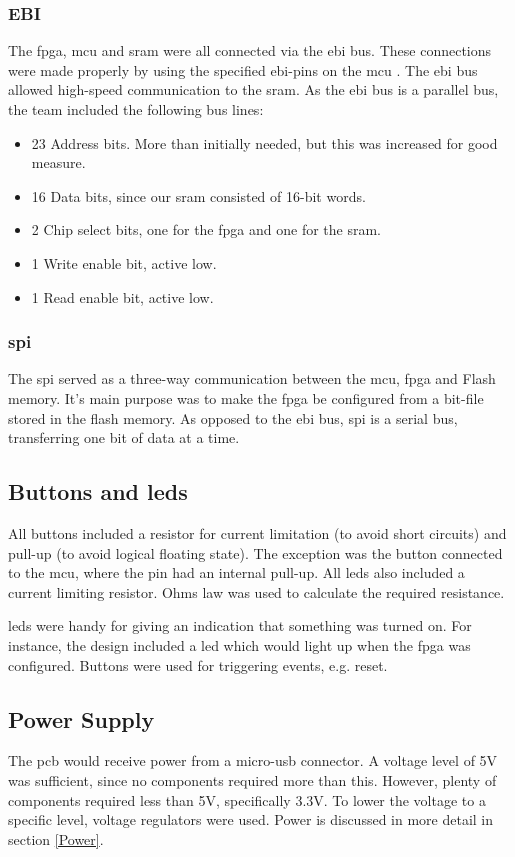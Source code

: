 \subsubsection{EBI}
The \gls{fpga}, \gls{mcu} and \gls{sram} were all connected via the \gls{ebi} bus.
These connections were made properly by using the specified \gls{ebi}-pins on the \gls{mcu} \cite[sec. 4.1]{efm32-datasheet}.
The \gls{ebi} bus allowed high-speed communication to the \gls{sram}.
As the \gls{ebi} bus is a parallel bus, the team included the following bus lines:
\begin{itemize}
\item 23 Address bits. More than initially needed, but this was increased for good measure.
\item 16 Data bits, since our \gls{sram} consisted of 16-bit words.
\item 2 Chip select bits, one for the \gls{fpga} and one for the \gls{sram}.
\item 1 Write enable bit, active low.
\item 1 Read enable bit, active low.
\end{itemize}

\subsubsection{\gls{spi}}
The \gls{spi} served as a three-way communication between the \gls{mcu}, \gls{fpga} and Flash memory.
It's main purpose was to make the \gls{fpga} be configured from a bit-file stored in the flash memory.
As opposed to the \gls{ebi} bus, \gls{spi} is a serial bus, transferring one bit of data at a time.

\subsection{Buttons and \gls{led}s}
All buttons included a resistor for current limitation (to avoid short circuits) and pull-up (to avoid logical floating state).
The exception was the button connected to the \gls{mcu}, where the pin had an internal pull-up.
All \gls{led}s also included a current limiting resistor.
Ohms law was used to calculate the required resistance\cite{ohm}.

\gls{led}s were handy for giving an indication that something was turned on.
For instance, the design included a \gls{led} which would light up when the \gls{fpga} was configured.
Buttons were used for triggering events, e.g. reset.

\subsection{Power Supply}
The \gls{pcb} would receive power from a micro-\gls{usb} connector.
A voltage level of 5V was sufficient, since no components required more than this.
However, plenty of components required less than 5V, specifically 3.3V.
To lower the voltage to a specific level, voltage regulators were used.
Power is discussed in more detail in section \ref{Power}.


